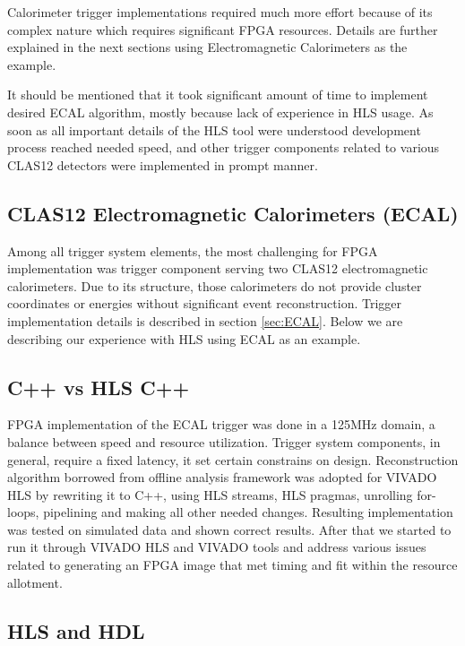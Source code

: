 Calorimeter trigger implementations required much more effort because of its complex nature which requires significant FPGA resources. Details are further explained in the next sections using Electromagnetic Calorimeters as the example.

It should be mentioned that it took significant amount of time to implement desired ECAL algorithm, mostly because lack of experience in HLS usage. As soon as all important details of the HLS tool were understood development process reached needed speed, and other trigger components related to various CLAS12 detectors were implemented in prompt manner.


\subsection{CLAS12 Electromagnetic Calorimeters (ECAL)}

Among all trigger system elements, the most challenging for FPGA implementation was trigger component serving two CLAS12 electromagnetic calorimeters. Due to its structure, those calorimeters do not provide cluster coordinates or energies without significant event reconstruction. Trigger implementation details is described in section \ref{sec:ECAL}. Below we are describing our experience with HLS using ECAL as an example.


\subsection{C++ vs HLS C++
}

FPGA implementation of the ECAL trigger was done in a 125MHz domain, a balance between speed and resource utilization. Trigger system components, in general, require a fixed latency, it set certain constrains on design. Reconstruction algorithm borrowed from offline analysis framework was adopted for VIVADO HLS by rewriting it to C++, using HLS streams, HLS pragmas, unrolling for-loops, pipelining and making all other needed changes. Resulting implementation was tested on simulated data and shown correct results. After that we started to run it through VIVADO HLS and VIVADO tools and address various issues related to generating an FPGA image that met timing and fit within the resource allotment.


\subsection{HLS and HDL}


